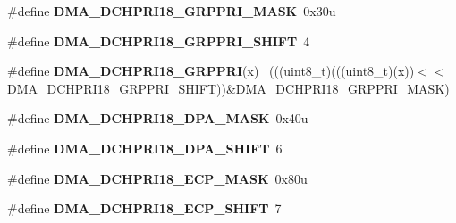 \begin{DoxyCompactItemize}
\item 
\hypertarget{group___d_m_a___register___masks_ga1abbfe2726060e4d3aa5baeb51b2addd}{}\#define {\bfseries D\+M\+A\+\_\+\+D\+C\+H\+P\+R\+I18\+\_\+\+G\+R\+P\+P\+R\+I\+\_\+\+M\+A\+S\+K}~0x30u\label{group___d_m_a___register___masks_ga1abbfe2726060e4d3aa5baeb51b2addd}

\item 
\hypertarget{group___d_m_a___register___masks_ga8d5fb9916393653444d328e6e7e48b74}{}\#define {\bfseries D\+M\+A\+\_\+\+D\+C\+H\+P\+R\+I18\+\_\+\+G\+R\+P\+P\+R\+I\+\_\+\+S\+H\+I\+F\+T}~4\label{group___d_m_a___register___masks_ga8d5fb9916393653444d328e6e7e48b74}

\item 
\hypertarget{group___d_m_a___register___masks_gaeda37cb272e1e3fcf8f28dd2683f176f}{}\#define {\bfseries D\+M\+A\+\_\+\+D\+C\+H\+P\+R\+I18\+\_\+\+G\+R\+P\+P\+R\+I}(x)                                  ~(((uint8\+\_\+t)(((uint8\+\_\+t)(x))$<$$<$D\+M\+A\+\_\+\+D\+C\+H\+P\+R\+I18\+\_\+\+G\+R\+P\+P\+R\+I\+\_\+\+S\+H\+I\+F\+T))\&D\+M\+A\+\_\+\+D\+C\+H\+P\+R\+I18\+\_\+\+G\+R\+P\+P\+R\+I\+\_\+\+M\+A\+S\+K)\label{group___d_m_a___register___masks_gaeda37cb272e1e3fcf8f28dd2683f176f}

\item 
\hypertarget{group___d_m_a___register___masks_ga4f1f511be29826bdd25701a3098cb95c}{}\#define {\bfseries D\+M\+A\+\_\+\+D\+C\+H\+P\+R\+I18\+\_\+\+D\+P\+A\+\_\+\+M\+A\+S\+K}~0x40u\label{group___d_m_a___register___masks_ga4f1f511be29826bdd25701a3098cb95c}

\item 
\hypertarget{group___d_m_a___register___masks_ga0cc00462ae09f107e3dbf3a9881462c5}{}\#define {\bfseries D\+M\+A\+\_\+\+D\+C\+H\+P\+R\+I18\+\_\+\+D\+P\+A\+\_\+\+S\+H\+I\+F\+T}~6\label{group___d_m_a___register___masks_ga0cc00462ae09f107e3dbf3a9881462c5}

\item 
\hypertarget{group___d_m_a___register___masks_gaf6e4b0349ea8da0cf4455561a8bdf95e}{}\#define {\bfseries D\+M\+A\+\_\+\+D\+C\+H\+P\+R\+I18\+\_\+\+E\+C\+P\+\_\+\+M\+A\+S\+K}~0x80u\label{group___d_m_a___register___masks_gaf6e4b0349ea8da0cf4455561a8bdf95e}

\item 
\hypertarget{group___d_m_a___register___masks_ga720d12f68dd86fc53a0ce03f0a56ae54}{}\#define {\bfseries D\+M\+A\+\_\+\+D\+C\+H\+P\+R\+I18\+\_\+\+E\+C\+P\+\_\+\+S\+H\+I\+F\+T}~7\label{group___d_m_a___register___masks_ga720d12f68dd86fc53a0ce03f0a56ae54}


\end{DoxyCompactItemize}
